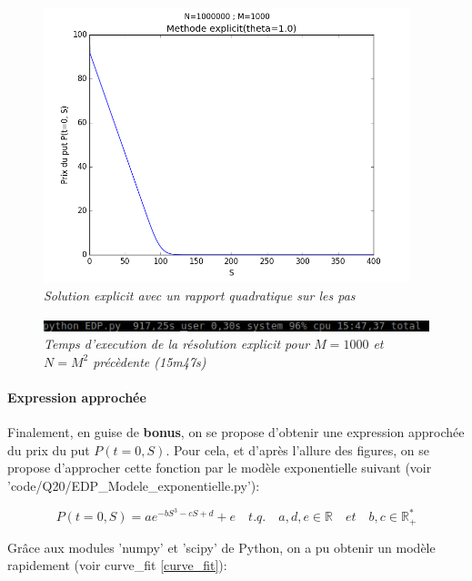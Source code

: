 \documentclass[10pt]{article}
\begin{document}
  \begin{figure}[H]
    \begin{center}
      \includegraphics[height=8cm,keepaspectratio]{./images/explicit_1000_1000000.png}
    \end{center}
    \caption{\textit{Solution explicit avec un rapport quadratique sur les pas}}
    \label{explicit_1000_1000000}
  \end{figure}
  
  \begin{figure}[H]
    \begin{center}
      \includegraphics[width=12cm,keepaspectratio]{./images/temps_explicit_1000.png}
    \end{center}
    \caption{\textit{Temps d'execution de la résolution explicit pour $M=1000$ et $N=M^2$ précèdente (15m47s)}}
    \label{temps_explicit_1000}
  \end{figure}
  
  \newpage
  \paragraph{Expression approchée}
  Finalement, en guise de \textbf{bonus}, on se propose d'obtenir une expression approchée du prix du put $P(t=0, S)$.
  Pour cela, et d'après l'allure des figures, on se propose d'approcher cette fonction par le modèle exponentielle suivant (voir 'code/Q20/EDP\_Modele\_exponentielle.py'):
  
  $$\boxed{P(t=0, S) = a e^{-bS^3 - cS + d} + e \quad t.q. \quad a, d, e \in \mathbb{R} \quad et \quad b, c \in \mathbb{R^*_+}}$$
  
  Grâce aux modules 'numpy' et 'scipy' de Python, on a pu obtenir un modèle rapidement (voir curve\_fit \ref{curve_fit}):
  
\end{document}
